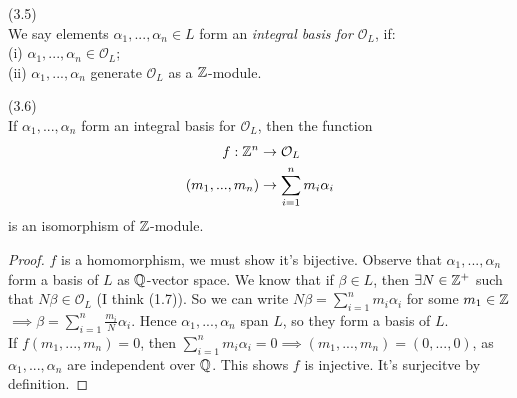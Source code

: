 \documentclass[a4paper]{article}
\begin{document}
\begin{defi} (3.5)\\
We say elements $\alpha_1,...,\alpha_n \in L$ form an \emph{integral basis for $\mathcal{O}_L$}, if:\\
(i) $\alpha_1,...,\alpha_n \in \mathcal{O}_L$;\\
(ii) $\alpha_1,...,\alpha_n$ generate $\mathcal{O}_L$ as a $\mathbb{Z}$-module.
\end{defi}

\begin{lemma} (3.6)\\
If $\alpha_1,...,\alpha_n$ form an integral basis for $\mathcal{O}_L$, then the function
\begin{equation*}
\begin{aligned}
f: \mathbb{Z}^n &\to \mathcal{O}_L\\
(m_1,...,m_n) &\to \sum_{i=1}^n m_i\alpha_i
\end{aligned}
\end{equation*}
is an isomorphism of $\mathbb{Z}$-module.
\begin{proof}
$f$ is a homomorphism, we must show it's bijective. Observe that $\alpha_1,...,\alpha_n$ form a basis of $L$ as $\mathbb{Q}$-vector space. We know that if $\beta \in L$, then $\exists N \in \mathbb{Z}^+$ such that $N\beta \in \mathcal{O}_L$ (I think (1.7)). So we can write $N\beta = \sum_{i=1}^n m_i \alpha_i$ for some $m_1 \in \mathbb{Z}$ $\implies \beta = \sum_{i=1}^n \frac{m_i}{N}\alpha_i$. Hence $\alpha_1,...,\alpha_n$ span $L$, so they form a basis of $L$.\\
If $f(m_1,...,m_n) = 0$, then $\sum_{i=1}^n m_i \alpha_i = 0 \implies (m_1,...,m_n) = (0,...,0)$, as $\alpha_1,...,\alpha_n$ are independent over $\mathbb{Q}$. This shows $f$ is injective. It's surjecitve by definition.
\end{proof}
\end{lemma}
\end{document}

